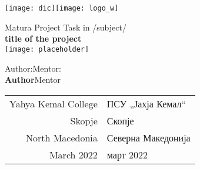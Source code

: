 \begin{titlepage}
	\begin{center}
	
	\texttt{[image: dic]}\hfill\texttt{[image: logo\_w]}
	    
    	\vfill
		
	\Large
	Matura Project Task in /subject/\\
	\vspace{0.5cm}
	\Huge
	\textbf{title of the project}\\
	\vspace{2cm}
	\texttt{[image: placeholder]}
		
		
	\vfill
	
	\normalsize
	Author:\hfill Mentor:\\
	\large
	\textbf{Author}\hfill Mentor
	
	\vspace{2cm}
		
	\normalsize
	\begin{tabular}{ r | l }
            Yahya Kemal College & ПСУ „Јахја Кемал“\\
            Skopje & Скопје\\
            North Macedonia & Северна Македонија\\
            March 2022 & март 2022
        \end{tabular}
            
	\end{center}
\end{titlepage}
